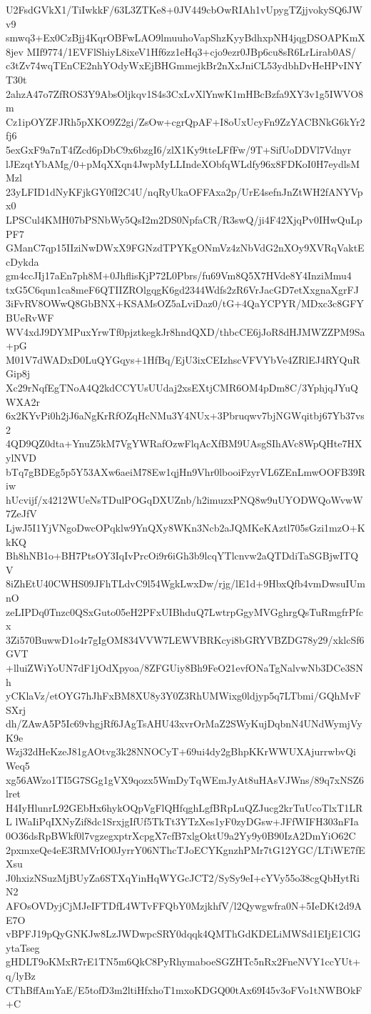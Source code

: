 U2FsdGVkX1/TiIwkkF/63L3ZTKe8+0JV449cbOwRIAh1vUpygTZjjvokySQ6JWv9
smwq3+Ex0CzBjj4KqrOBFwLAO9lmuuhoVapShzKyyBdhxpNH4jqgDSOAPKmX8jev
MIf9774/1EVFlShiyL8ixeV1Hf6zz1eHq3+cjo9ezr0JBp6cu8sR6LrLirab0AS/
c3tZv74wqTEnCE2nhYOdyWxEjBHGmmejkBr2nXxJniCL53ydbhDvHeHPvINYT30t
2ahzA47o7ZfROS3Y9AbsOljkqv1S4s3CxLvXlYnwK1mHBcBzfa9XY3v1g5IWVO8m
Cz1ipOYZFJRh5pXKO9Z2gi/ZsOw+cgrQpAF+I8oUxUcyFn9ZzYACBNkG6kYr2fj6
5exGxF9a7nT4fZcd6pDbC9x6bzgI6/zlX1Ky9tteLFfFw/9T+SifUoDDVl7Vdnyr
lJEzqtYbAMg/0+pMqXXqn4JwpMyLLIndeXObfqWLdfy96x8FDKoI0H7eydlsMMzl
23yLFID1dNyKFjkGY0fI2C4U/nqRyUkaOFFAxa2p/UrE4sefnJnZtWH2fANYVpx0
LPSCul4KMH07bPSNbWy5QsI2m2DS0NpfaCR/R3swQ/ji4F42XjqPv0IHwQuLpPF7
GManC7qp15IIziNwDWxX9FGNzdTPYKgONmVz4zNbVdG2nXOy9XVRqVaktEcDykda
gm4ccJIj17aEn7ph8M+0JhflisKjP72L0Pbrs/fu69Vm8Q5X7HVde8Y4InziMmu4
txG5C6qun1ca8meF6QTIIZROlgqgK6gd2344Wdfs2zR6VrJacGD7etXxgnaXgrFJ
3iFvRV8OWwQ8GbBNX+KSAMsOZ5aLviDaz0/tG+4QaYCPYR/MDxc3c8GFYBUeRvWF
WV4xdJ9DYMPuxYrwTf0pjztkegkJr8hndQXD/thbcCE6jJoR8dHJMWZZPM9Sa+pG
M01V7dWADxD0LuQYGqys+1HfBq/EjU3ixCEIzhscVFVYbVe4ZRlEJ4RYQuRGip8j
Xc29rNqfEgTNoA4Q2kdCCYUsUUdaj2xsEXtjCMR6OM4pDm8C/3YphjqJYuQWXA2r
6x2KYvPi0h2jJ6aNgKrRfOZqHcNMu3Y4NUx+3Pbruqwv7bjNGWqitbj67Yb37vs2
4QD9QZ0dta+YnuZ5kM7VgYWRafOzwFlqAcXfBM9UAsgSIhAVc8WpQHte7HXylNVD
bTq7gBDEg5p5Y53AXw6aeiM78Ew1qjHn9Vhr0lbooiFzyrVL6ZEnLmwOOFB39Riw
hUcvijf/x4212WUeNsTDulPOGqDXUZnb/h2imuzxPNQ8w9uUYODWQoWvwW7ZeJfV
LjwJ5I1YjVNgoDwcOPqklw9YnQXy8WKn3Ncb2aJQMKeKAztl705sGzi1mzO+KkKQ
Bh8hNB1o+BH7PtsOY3IqIvPrcOi9r6iGh3b9lcqYTlcnvw2aQTDdiTaSGBjwITQV
8iZhEtU40CWHS09JFhTLdvC9l54WgkLwxDw/rjg/lE1d+9HbxQfb4vmDwsuIUmnO
zeLIPDq0Tnzc0QSxGuto05eH2PFxUIBhduQ7LwtrpGgyMVGghrgQsTuRmgfrPfcx
3Zi570BuwwD1o4r7gIgOM834VVW7LEWVBRKcyi8bGRYVBZDG78y29/xklcSf6GVT
+lluiZWiYoUN7dF1jOdXpyoa/8ZFGUiy8Bh9FeO21evfONaTgNalvwNb3DCe3SNh
yCKlaVz/etOYG7hJhFxBM8XU8y3Y0Z3RhUMWixg0ldjyp5q7LTbmi/GQhMvFSXrj
dh/ZAwA5P5Ic69vhgjRf6JAgTsAHU43xvrOrMaZ2SWyKujDqbnN4UNdWymjVyK9e
Wzj32dHeKzeJ81gAOtvg3k28NNOCyT+69ui4dy2gBhpKKrWWUXAjurrwbvQiWeq5
xg56AWzo1TI5G7SGg1gVX9qozx5WmDyTqWEmJyAt8uHAsVJWns/89q7xNSZ6lret
H4IyHlunrL92GEbHx6hykOQpVgFlQHfqghLgfBRpLuQZJucg2krTuUcoTlxT1LRL
lWaIiPqIXNyZif8dc1SrxjgIfUf5TkTt3YTzXes1yF0zyDGsw+JFfWIFH303nFIa
0O36dsRpBWkf0l7vgzegxptrXcpgX7cfB7xlgOktU9a2Yy9y0B90IzA2DmYiO62C
2pxmxeQe4eE3RMVrIO0JyrrY06NThcTJoECYKgnzhPMr7tG12YGC/LTiWE7fEXsu
J0hxizNSuzMjBUyZa6STXqYinHqWYGcJCT2/SySy9eI+cYVy55o38cgQbHytRiN2
AFOsOVDyjCjMJeIFTDfL4WTvFFQbY0MzjkhfV/l2Qywgwfra0N+5IeDKt2d9AE7O
vBPFJ19pQyGNKJw8LzJWDwpcSRY0dqqk4QMThGdKDELiMWSd1EIjE1ClGytaTseg
gHDLT9oKMxR7rE1TN5m6QkC8PyRhymaboeSGZHTc5nRx2FneNVY1ccYUt+q/lyBz
CThBffAmYaE/E5tofD3m2ltiHfxhoT1mxoKDGQ00tAx69I45v3oFVo1tNWBOkF+C
